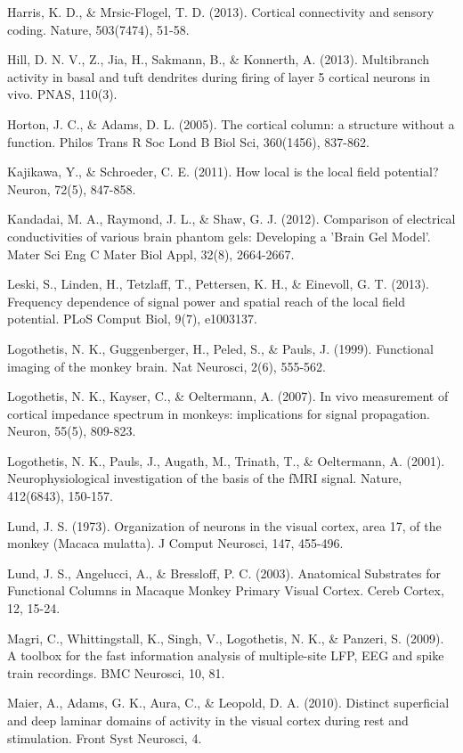 \documentclass{article}
\begin{document}
Harris, K. D., \& Mrsic-Flogel, T. D. (2013). Cortical connectivity and sensory coding. Nature, 503(7474), 51-58.

Hill, D. N. V., Z., Jia, H., Sakmann, B., \& Konnerth, A. (2013). Multibranch activity in basal and tuft dendrites during firing of layer 5 cortical neurons in vivo. PNAS, 110(3).

Horton, J. C., \& Adams, D. L. (2005). The cortical column: a structure without a function. Philos Trans R Soc Lond B Biol Sci, 360(1456), 837-862.

Kajikawa, Y., \& Schroeder, C. E. (2011). How local is the local field potential? Neuron, 72(5), 847-858.

Kandadai, M. A., Raymond, J. L., \& Shaw, G. J. (2012). Comparison of electrical conductivities of various brain phantom gels: Developing a 'Brain Gel Model'. Mater Sci Eng C Mater Biol Appl, 32(8), 2664-2667.

Leski, S., Linden, H., Tetzlaff, T., Pettersen, K. H., \& Einevoll, G. T. (2013). Frequency dependence of signal power and spatial reach of the local field potential. PLoS Comput Biol, 9(7), e1003137.

Logothetis, N. K., Guggenberger, H., Peled, S., \& Pauls, J. (1999). Functional imaging of the monkey brain. Nat Neurosci, 2(6), 555-562.

Logothetis, N. K., Kayser, C., \& Oeltermann, A. (2007). In vivo measurement of cortical impedance spectrum in monkeys: implications for signal propagation. Neuron, 55(5), 809-823.

Logothetis, N. K., Pauls, J., Augath, M., Trinath, T., \& Oeltermann, A. (2001). Neurophysiological investigation of the basis of the fMRI signal. Nature, 412(6843), 150-157.

Lund, J. S. (1973). Organization of neurons in the visual cortex, area 17, of the monkey (Macaca mulatta). J Comput Neurosci, 147, 455-496.

Lund, J. S., Angelucci, A., \& Bressloff, P. C. (2003). Anatomical Substrates for Functional Columns in Macaque Monkey Primary Visual Cortex. Cereb Cortex, 12, 15-24.

Magri, C., Whittingstall, K., Singh, V., Logothetis, N. K., \& Panzeri, S. (2009). A toolbox for the fast information analysis of multiple-site LFP, EEG and spike train recordings. BMC Neurosci, 10, 81.

Maier, A., Adams, G. K., Aura, C., \& Leopold, D. A. (2010). Distinct superficial and deep laminar domains of activity in the visual cortex during rest and stimulation. Front Syst Neurosci, 4.
\end{document}
